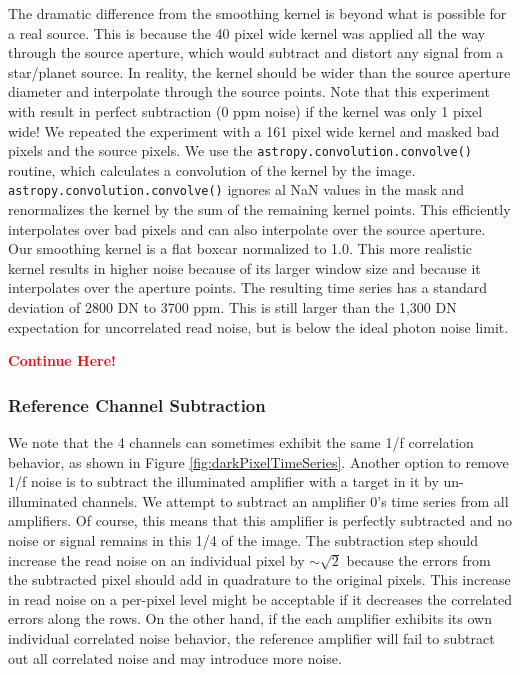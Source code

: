 \documentclass{aastex62}
\begin{document}
The dramatic difference from the smoothing kernel is beyond what is possible for a real source.
This is because the 40 pixel wide kernel was applied all the way through the source aperture, which would subtract and distort any signal from a star/planet source.
In reality, the kernel should be wider than the source aperture diameter and interpolate through the source points.
Note that this experiment with result in perfect subtraction (0 ppm noise) if the kernel was only 1 pixel wide!
We repeated the experiment with a 161 pixel wide kernel and masked bad pixels and the source pixels.
We use the \texttt{astropy.convolution.convolve()} routine, which calculates a convolution of the kernel by the image.
\texttt{astropy.convolution.convolve()} ignores al NaN values in the mask and renormalizes the kernel by the sum of the remaining kernel points.
This efficiently interpolates over bad pixels and can also interpolate over the source aperture.
Our smoothing kernel is a flat boxcar normalized to 1.0.
This more realistic kernel results in higher noise because of its larger window size and because it interpolates over the aperture points.
The resulting time series has a standard deviation of 2800 DN to 3700 ppm.
This is still larger than the 1,300 DN expectation for uncorrelated read noise, but is below the ideal photon noise limit.

\textcolor{red}{\bf Continue Here!}

\subsubsection{Reference Channel Subtraction}
We note that the 4 channels can sometimes exhibit the same 1/f correlation behavior, as shown in Figure \ref{fig:darkPixelTimeSeries}.
Another option to remove 1/f noise is to subtract the illuminated amplifier with a target in it by un-illuminated channels.
We attempt to subtract an amplifier 0's time series from all amplifiers.
Of course, this means that this amplifier is perfectly subtracted and no noise or signal remains in this 1/4 of the image.
The subtraction step should increase the read noise on an individual pixel by $\sim \sqrt{2}$ because the errors from the subtracted pixel should add in quadrature to the original pixels.
This increase in read noise on a per-pixel level might be acceptable if it decreases the correlated errors along the rows.
On the other hand, if the each amplifier exhibits its own individual correlated noise behavior, the reference amplifier will fail to subtract out all correlated noise and may introduce more noise.
\end{document}
